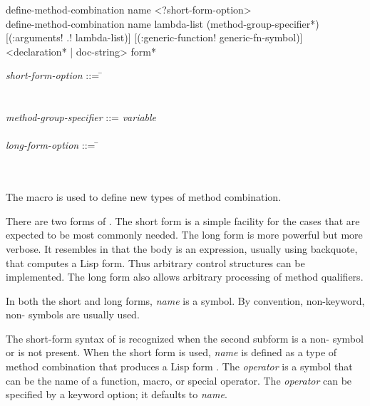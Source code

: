 \begin{defmac}
define-method-combination name <?short-form-option> \\
define-method-combination name lambda-list
    ({method-group-specifier}*)
    [(\!:arguments! \!.! lambda-list)]
    [(\!:generic-function! generic-fn-symbol)]
    <{declaration}* | doc-string>
    {form}*

\begin{tabbing}
\emph{short-form-option} ::= \= \\
\Mor~ \\
\Mor~  \\
\emph{method-group-specifier} ::= \cd{(}\=\emph{variable}
     \\
\>\cd{)} \\
\emph{long-form-option} ::= \= \\
\Mor~ \\
\Mor~
\end{tabbing}
The macro  is used to define new types
of method combination.

There are two forms of .  The short
form is a simple facility for the cases that are expected
to be most commonly needed.  The long form is more powerful but more
verbose.  It resembles  in that the body is an
expression, usually using backquote, that computes a Lisp form.  Thus
arbitrary control structures can be implemented.  The long form also
allows arbitrary processing of method qualifiers.

In both the short and long forms, \emph{name} is a symbol.  By convention,
non-keyword, non- symbols are usually used.

\medskip

The short-form syntax of  is recognized
when the second subform is a non- symbol or is not present.
When the short form is used, \emph{name} is defined as a type of
method combination that produces a Lisp form .  The \emph{operator} is a symbol
that can be the name of a function, macro, or special operator.  The
\emph{operator} can be specified by a keyword option; it defaults to
\emph{name}. 


\end{defmac}
